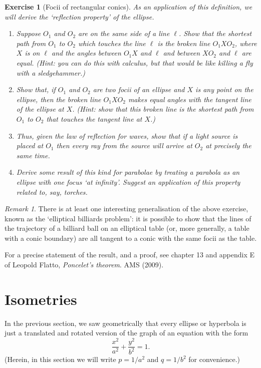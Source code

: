 \documentclass[a4paper,leqno,10pt]{article}
\theoremstyle{exercise}
\newtheorem{Exercise}{Exercise}
\newenvironment{exercise}
  {\begin{mdframed}\begin{Exercise}}
  {\end{Exercise}\end{mdframed}}
\theoremstyle{plain}
\theoremstyle{definition}
\theoremstyle{remark}
\newtheorem*{rem}{Remark}
\begin{document}
\begin{exercise}[Focii of rectangular conics]
  As an application of this definition, we will derive the `reflection property' of the ellipse.
  \begin{enumerate}
    \item Suppose $ O_1 $ and $ O_2 $ are on the same side of a line $ \ell $. Show that the shortest path from $ O_1 $
          to $ O_2 $ which touches the line $ \ell $ is the broken line $ O_1XO_2 $, where $ X $ is on $ \ell $ and
          the angles between $ O_1 X $ and $ \ell $ and between $ X O_2 $ and $ \ell $ are equal. (Hint: you can do this
          with calculus, but that would be like killing a fly with a sledgehammer.)
    \item Show that, if $ O_1 $ and $ O_2 $ are two focii of an ellipse and $ X $ is any point on the ellipse, then the broken line $ O_1 X O_2 $
          makes equal angles with the tangent line of the ellipse at $ X $. (Hint: show that this broken line is the shortest path from $ O_1 $ to $ O_2 $
          that touches the tangent line at $ X $.)
    \item Thus, given the law of reflection for waves, show that if a light source is placed at $ O_1 $ then every ray from the source
          will arrive at $ O_2 $ at precisely the same time.
    \item Derive some result of this kind for parabolae by treating a parabola as an ellipse with one focus `at infinity'. Suggest an
          application of this property related to, say, torches.
  \end{enumerate}
\end{exercise}

\begin{rem}
  There is at least one interesting generalisation of the above exercise, known as the `elliptical billiards problem':
  it is possible to show that the lines of the trajectory of a billiard ball on an elliptical table (or, more generally, a table with
  a conic boundary) are all tangent to a conic with the same focii as the table.

  For a precise statement of the result, and a proof, see chapter 13 and appendix E of Leopold Flatto, \emph{Poncelet's theorem}. AMS (2009).
\end{rem}

\section{Isometries}
In the previous section, we saw geometrically that every ellipse or hyperbola is just a translated and rotated version of the graph of
an equation with the form
\begin{equation}
  \frac{x^2}{a^2} + \frac{y^2}{b^2} = 1.
\end{equation}
(Herein, in this section we will write $ p = 1/a^2 $ and $ q = 1/b^2 $ for convenience.)
\end{document}
